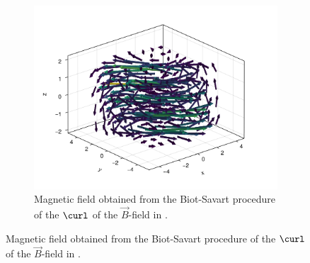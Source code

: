 \documentclass[12pt]{article}
\begin{document}
  \begin{figure}[H]
    \begin{subfigure}[t]{0.48\textwidth}
      \centering
      \includegraphics[width=\textwidth]{../figures/cdpbr-b-field.pdf}
      \caption{Magnetic field obtained from the Biot-Savart procedure of the $\curl$ of the $\vec{B}$-field in .}
      \label{fig:cdpbr-b-field}
    \end{subfigure}
  \end{figure}
\end{document}
